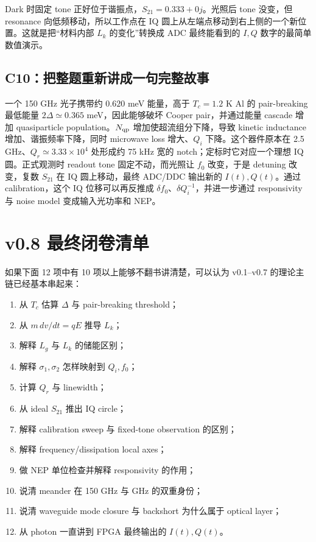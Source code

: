 \documentclass[11pt,a4paper,openany]{ctexrep}
\begin{document}
\begin{answerbox}[title=为什么这个结果值得算？]
Dark 时固定 tone 正好位于谐振点，$S_{21}=0.333+0j$。光照后 tone 没变，但 resonance 向低频移动，所以工作点在 IQ 圆上从左端点移动到右上侧的一个新位置。这就是把“材料内部 $L_k$ 的变化”转换成 ADC 最终能看到的 $I,Q$ 数字的最简单数值演示。
\end{answerbox}

\subsection*{C10：把整题重新讲成一句完整故事}

一个 150 GHz 光子携带约 $0.620$ meV 能量，高于 $T_c=1.2$ K Al 的 pair-breaking 最低能量 $2\Delta\simeq0.365$ meV，因此能够破坏 Cooper pair，并通过能量 cascade 增加 quasiparticle population。$N_{\rm qp}$ 增加使超流组分下降，导致 kinetic inductance 增加、谐振频率下降，同时 microwave loss 增大、$Q_i$ 下降。这个器件原本在 2.5 GHz、$Q_r\simeq3.33\times10^4$ 处形成约 75 kHz 宽的 notch；定标时它对应一个理想 IQ 圆。正式观测时 readout tone 固定不动，而光照让 $f_0$ 改变，于是 detuning 改变，复数 $S_{21}$ 在 IQ 圆上移动，最终 ADC/DDC 输出新的 $I(t),Q(t)$。通过 calibration，这个 IQ 位移可以再反推成 $\delta f_0$、$\delta Q_i^{-1}$，并进一步通过 responsivity 与 noise model 变成输入光功率和 NEP。

\section{v0.8 最终闭卷清单}

如果下面 12 项中有 10 项以上能够不翻书讲清楚，可以认为 v0.1--v0.7 的理论主链已经基本串起来：
\begin{enumerate}
  \item 从 $T_c$ 估算 $\Delta$ 与 pair-breaking threshold；
  \item 从 $m\,dv/dt=qE$ 推导 $L_k$；
  \item 解释 $L_g$ 与 $L_k$ 的储能区别；
  \item 解释 $\sigma_1,\sigma_2$ 怎样映射到 $Q_i,f_0$；
  \item 计算 $Q_r$ 与 linewidth；
  \item 从 ideal $S_{21}$ 推出 IQ circle；
  \item 解释 calibration sweep 与 fixed-tone observation 的区别；
  \item 解释 frequency/dissipation local axes；
  \item 做 NEP 单位检查并解释 responsivity 的作用；
  \item 说清 meander 在 150 GHz 与 GHz 的双重身份；
  \item 说清 waveguide mode closure 与 backshort 为什么属于 optical layer；
  \item 从 photon 一直讲到 FPGA 最终输出的 $I(t),Q(t)$。
\end{enumerate}
\end{document}

